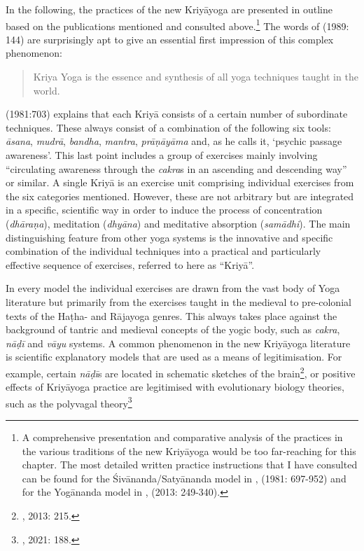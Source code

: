 In the following, the practices of the new Kriyāyoga are presented in outline based on the publications mentioned and consulted above.\footnote{A comprehensive presentation and comparative analysis of the practices in the various traditions of the new Kriyāyoga would be too far-reaching for this chapter. The most detailed written practice instructions that I have consulted can be found for the Śivānanda/Satyānanda model in \citeauthor{kriyayogasarasvati1981}, (1981: 697-952) and for the Yogānanda model in \citeauthor{kriyayoganityananda2013}, (2013: 249-340).} The words of \citeauthor{hariharananda1989} (1989: 144) are surprisingly apt to give an essential first impression of this complex phenomenon: \begin{quote} Kriya Yoga is the essence and synthesis of all yoga techniques taught in the world.  \end{quote} 
\citeauthor{kriyayogasarasvati1981} (1981:703) explains that each Kriyā consists of a certain number of subordinate techniques. These always consist of a combination of the following six tools: \textit{āsana}, \textit{mudrā}, \textit{bandha}, \textit{mantra}, \textit{prāṇāyāma} and, as he calls it, `psychic passage awareness'. This last point includes a group of exercises mainly involving ``circulating awareness through the \textit{cakra}s in an ascending and descending way'' or similar. A single Kriyā is an exercise unit comprising individual exercises from the six categories mentioned. However, these are not arbitrary but are integrated in a specific, scientific way in order to induce the process of concentration (\textit{dhāraṇa}), meditation (\textit{dhyāna}) and meditative absorption (\textit{samādhi}). The main distinguishing feature from other yoga systems is the innovative and specific combination of the individual techniques into a practical and particularly effective sequence of exercises, referred to here as ``Kriyā''.

In every model the individual exercises are drawn from the vast body of Yoga literature but primarily from the exercises taught in the medieval to pre-colonial texts of the Haṭha- and Rājayoga genres. This always takes place against the background of tantric and medieval concepts of the yogic body, such as \textit{cakra}, \textit{nāḍī} and \textit{vāyu} systems. A common phenomenon in the new Kriyāyoga literature is scientific explanatory models that are used as a means of legitimisation. For example, certain \textit{nāḍī}s are located in schematic sketches of the brain\footnote{\citeauthor{kriyayoganityananda2013}, 2013: 215.}, or positive effects of Kriyāyoga practice are legitimised with evolutionary biology theories, such as the polyvagal theory\footnote{\citeauthor{kriyayogalowenstein}, 2021: 188.}

